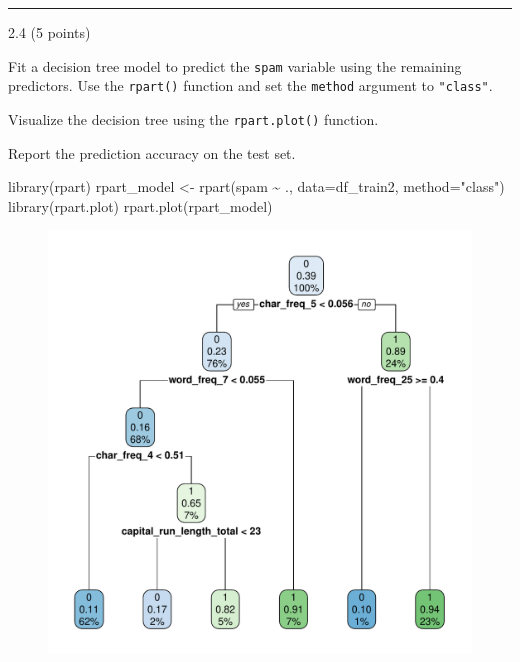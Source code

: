 \documentclass[
  letterpaper,
  DIV=11,
  numbers=noendperiod]{scrartcl}
\newenvironment{Shaded}{\begin{snugshade}}{\end{snugshade}}
\newcommand{\AttributeTok}[1]{\textcolor[rgb]{0.40,0.45,0.13}{#1}}
\newcommand{\FunctionTok}[1]{\textcolor[rgb]{0.28,0.35,0.67}{#1}}
\newcommand{\NormalTok}[1]{\textcolor[rgb]{0.00,0.23,0.31}{#1}}
\newcommand{\OtherTok}[1]{\textcolor[rgb]{0.00,0.23,0.31}{#1}}
\newcommand{\SpecialCharTok}[1]{\textcolor[rgb]{0.37,0.37,0.37}{#1}}
\newcommand{\StringTok}[1]{\textcolor[rgb]{0.13,0.47,0.30}{#1}}
\begin{document}
\begin{center}\rule{0.5\linewidth}{0.5pt}\end{center}

2.4 (5 points)

Fit a decision tree model to predict the \texttt{spam} variable using
the remaining predictors. Use the \texttt{rpart()} function and set the
\texttt{method} argument to \texttt{"class"}.

Visualize the decision tree using the \texttt{rpart.plot()} function.

Report the prediction accuracy on the test set.

\begin{Shaded}
\begin{Highlighting}[]
\FunctionTok{library}\NormalTok{(rpart)}
\NormalTok{rpart\_model }\OtherTok{\textless{}{-}} \FunctionTok{rpart}\NormalTok{(spam }\SpecialCharTok{\textasciitilde{}}\NormalTok{ ., }\AttributeTok{data=}\NormalTok{df\_train2, }\AttributeTok{method=}\StringTok{"class"}\NormalTok{)}
\FunctionTok{library}\NormalTok{(rpart.plot)}
\FunctionTok{rpart.plot}\NormalTok{(rpart\_model)}
\end{Highlighting}
\end{Shaded}

\begin{figure}[H]

{\centering \includegraphics{hw5_files/figure-pdf/unnamed-chunk-18-1.pdf}

}

\end{figure}
\end{document}
